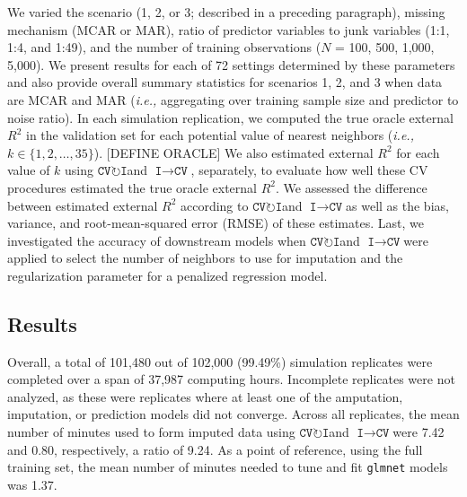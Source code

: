 \documentclass[AMA,STIX1COL,doublespace]{WileyNJD-v2}
\begin{document}
We varied the scenario (1, 2, or 3; described in a preceding paragraph),
missing mechanism (MCAR or MAR), ratio of predictor variables to junk
variables (1:1, 1:4, and 1:49), and the number of training observations
(\(N\) = 100, 500, 1,000, 5,000). We present results for each of 72
settings determined by these parameters and also provide overall summary
statistics for scenarios 1, 2, and 3 when data are MCAR and MAR
(\textit{i.e., }aggregating over training sample size and predictor to
noise ratio). In each simulation replication, we computed the true
oracle external \(R^2\) in the validation set for each potential value
of nearest neighbors
(\textit{i.e., }\(k \in \lbrace 1, 2, \ldots, 35 \rbrace\)). {[}DEFINE
ORACLE{]} We also estimated external \(R^2\) for each value of \(k\)
using $\texttt{CV}\!\circlearrowright\!\texttt{I}$\space and
$\texttt{I}\!\!\rightarrow\!\texttt{CV}$, separately, to evaluate how
well these CV procedures estimated the true oracle external \(R^2\). We
assessed the difference between estimated external \(R^2\) according to
$\texttt{CV}\!\circlearrowright\!\texttt{I}$\space and
$\texttt{I}\!\!\rightarrow\!\texttt{CV}$\space as well as the bias,
variance, and root-mean-squared error (RMSE) of these estimates. Last,
we investigated the accuracy of downstream models when
$\texttt{CV}\!\circlearrowright\!\texttt{I}$\space and
$\texttt{I}\!\!\rightarrow\!\texttt{CV}$\space were applied to select
the number of neighbors to use for imputation and the regularization
parameter for a penalized regression model.

\subsection{Results} \label{subsec:sim_results}

Overall, a total of 101,480 out of 102,000 (99.49\%) simulation
replicates were completed over a span of 37,987 computing hours.
Incomplete replicates were not analyzed, as these were replicates where
at least one of the amputation, imputation, or prediction models did not
converge. Across all replicates, the mean number of minutes used to form
imputed data using
$\texttt{CV}\!\circlearrowright\!\texttt{I}$\space and
$\texttt{I}\!\!\rightarrow\!\texttt{CV}$\space were 7.42 and 0.80,
respectively, a ratio of 9.24. As a point of reference, using the full
training set, the mean number of minutes needed to tune and fit
\texttt{glmnet} models was 1.37.
\end{document}
